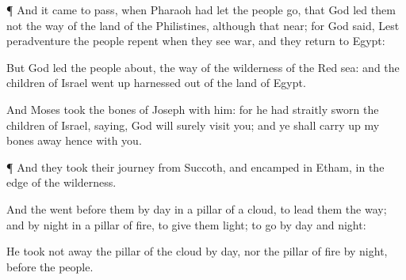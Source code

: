 {\par }{\PP {}¶ And it came to pass, when
Pharaoh had let the
people
go, that
God
led them not
{} the
way of the
land of the
Philistines,
although that
{}
near; for
God
said, Lest peradventure the
people
repent when they
see
war, and they
return to
Egypt:

But
God
led the
people
about,
{} the
way of the
wilderness of the
Red
sea: and the
children of
Israel went
up
harnessed out of the
land of
Egypt.

And
Moses
took the
bones of
Joseph with him: for he had
straitly
sworn the
children of
Israel,
saying,
God will
surely
visit you; and ye shall carry
up my
bones
away hence with you.


\par }{\PP {}¶ And they took their
journey from
Succoth, and
encamped in
Etham, in the
edge of the
wilderness.

And the
{}
went
before them by
day in a
pillar of a
cloud, to
lead them the
way; and by
night in a
pillar of
fire, to give them
light; to
go by
day and
night:

He took not
away the
pillar of the
cloud by
day, nor the
pillar of
fire by
night,
{}
before the
people.




\par }
